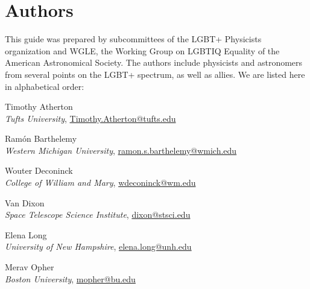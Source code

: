 %

\chapter{Authors}	%
\label{authors}		%
\normalsize			%

This guide was prepared by subcommittees of the LGBT+ Physicists organization and WGLE, the Working Group on LGBTIQ Equality of the American Astronomical Society. The authors include physicists and astronomers from several points on the LGBT+ spectrum, as well as allies. We are listed here in alphabetical order:


\vspace*{\baselineskip}

\noindent Timothy Atherton\\
\indent \emph{Tufts University}, \href{mailto:Timothy.Atherton@tufts.edu}{Timothy.Atherton@tufts.edu}\vspace*{\baselineskip}

\noindent Ram\'{o}n Barthelemy\\
\indent \emph{Western Michigan University}, \href{mailto:ramon.s.barthelemy@wmich.edu}{ramon.s.barthelemy@wmich.edu}\vspace*{\baselineskip}

\noindent Wouter Deconinck\\
\indent \emph{College of William and Mary}, \href{mailto:wdeconinck@wm.edu}{wdeconinck@wm.edu}\vspace*{\baselineskip}

\noindent Van Dixon\\
\indent \emph{Space Telescope Science Institute}, \href{mailto:dixon@stsci.edu}{dixon@stsci.edu}\vspace*{\baselineskip}

\noindent Elena Long\\
\indent \emph{University of New Hampshire}, \href{mailto:elena.long@unh.edu}{elena.long@unh.edu}\vspace*{\baselineskip}

\noindent Merav Opher\\
\indent \emph{Boston University}, \href{mailto:mopher@bu.edu}{mopher@bu.edu}\vspace*{\baselineskip}

